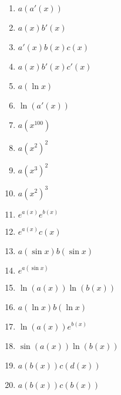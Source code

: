 \documentclass{article}
\begin{document}
\begin{multicols}{2}
\begin{enumerate}
    \item $a(a'(x))$
    \item $a(x)b'(x)$
    \item $a'(x)b(x)c(x)$
    \item $a(x)b'(x)c'(x)$
    \item $a(\ln x)$
    \item $\ln(a'(x))$
    \item $a(x^{100})$
    \item $a(x^2)^2$
    \item $a(x^3)^2$
    \item $a(x^2)^3$
    \item $e^{a(x)}e^{b(x)}$
    \item $e^{a(x)}c(x)$
    \item $a(\sin x)b(\sin x)$
    \item $e^{a(\sin x)}$
    \item $\ln(a(x))\ln(b(x))$
    \item $a(\ln x)b(\ln x)$
    \item $\ln(a(x))e^{b(x)}$
    \item $\sin(a(x))\ln(b(x))$
    \item $a(b(x))c(d(x))$
    \item $a(b(x))c(b(x))$
\end{enumerate} 
\end{multicols}
\end{document}
